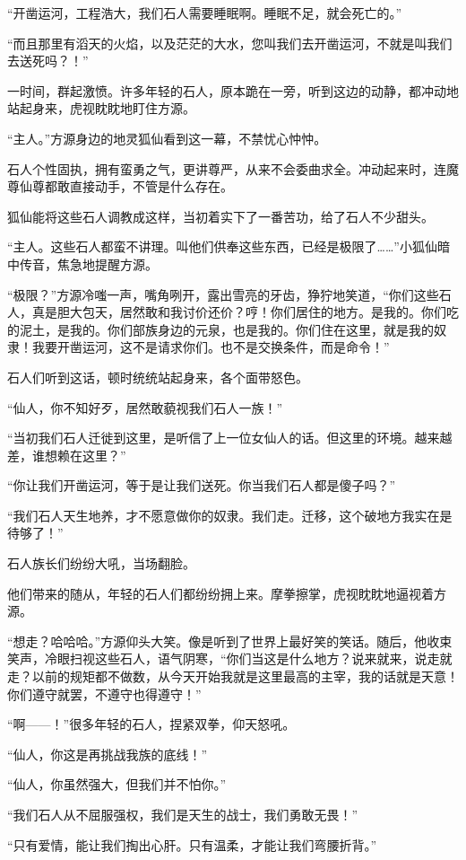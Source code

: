 \begin{this_body}
“开凿运河，工程浩大，我们石人需要睡眠啊。睡眠不足，就会死亡的。”

“而且那里有滔天的火焰，以及茫茫的大水，您叫我们去开凿运河，不就是叫我们去送死吗？！”

一时间，群起激愤。许多年轻的石人，原本跪在一旁，听到这边的动静，都冲动地站起身来，虎视眈眈地盯住方源。

“主人。”方源身边的地灵狐仙看到这一幕，不禁忧心忡忡。

石人个性固执，拥有蛮勇之气，更讲尊严，从来不会委曲求全。冲动起来时，连魔尊仙尊都敢直接动手，不管是什么存在。

狐仙能将这些石人调教成这样，当初着实下了一番苦功，给了石人不少甜头。

“主人。这些石人都蛮不讲理。叫他们供奉这些东西，已经是极限了……”小狐仙暗中传音，焦急地提醒方源。

“极限？”方源冷嗤一声，嘴角咧开，露出雪亮的牙齿，狰狞地笑道，“你们这些石人，真是胆大包天，居然敢和我讨价还价？哼！你们居住的地方。是我的。你们吃的泥土，是我的。你们部族身边的元泉，也是我的。你们住在这里，就是我的奴隶！我要开凿运河，这不是请求你们。也不是交换条件，而是命令！”

石人们听到这话，顿时统统站起身来，各个面带怒色。

“仙人，你不知好歹，居然敢藐视我们石人一族！”

“当初我们石人迁徙到这里，是听信了上一位女仙人的话。但这里的环境。越来越差，谁想赖在这里？”

“你让我们开凿运河，等于是让我们送死。你当我们石人都是傻子吗？”

“我们石人天生地养，才不愿意做你的奴隶。我们走。迁移，这个破地方我实在是待够了！”

石人族长们纷纷大吼，当场翻脸。

他们带来的随从，年轻的石人们都纷纷拥上来。摩拳擦掌，虎视眈眈地逼视着方源。

“想走？哈哈哈。”方源仰头大笑。像是听到了世界上最好笑的笑话。随后，他收束笑声，冷眼扫视这些石人，语气阴寒，“你们当这是什么地方？说来就来，说走就走？以前的规矩都不做数，从今天开始我就是这里最高的主宰，我的话就是天意！你们遵守就罢，不遵守也得遵守！”

“啊——！”很多年轻的石人，捏紧双拳，仰天怒吼。

“仙人，你这是再挑战我族的底线！”

“仙人，你虽然强大，但我们并不怕你。”

“我们石人从不屈服强权，我们是天生的战士，我们勇敢无畏！”

“只有爱情，能让我们掏出心肝。只有温柔，才能让我们弯腰折背。”


\end{this_body}
